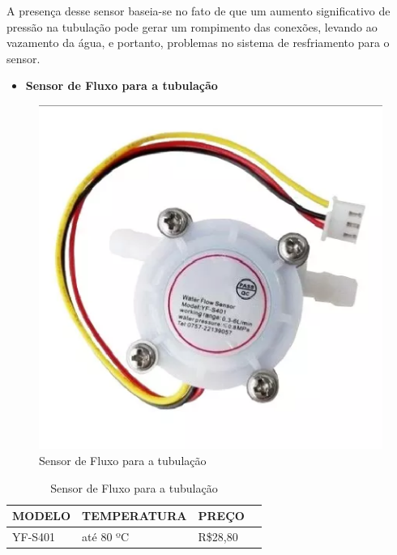 A presença desse sensor baseia-se no fato de que um aumento significativo de pressão na tubulação pode gerar um rompimento das conexões, levando ao vazamento da água, e portanto, problemas no sistema de  resfriamento para o sensor.

\begin{itemize}
    \item \textbf{Sensor de Fluxo para a tubulação}
\end{itemize}
\begin{figure}[!htb]                  
	\centering                          
	\includegraphics[scale=0.5]{figuras/Figura6.eps}
	\caption{ Sensor de Fluxo para a tubulação}             
\end{figure}

\begin{table}[!h]
    \centering
    \begin{tabular}{|p{3cm}|p{5cm}|p{3cm}|p{3cm}|}
    \hline
    \textbf{MODELO} & \textbf{TEMPERATURA}    & \textbf{PREÇO} \\ \hline
    YF-S401      & até 80 ºC &  R\$28,80  \\ \hline
    \end{tabular}
    \caption{Sensor de Fluxo para a tubulação}
    \end{table}

